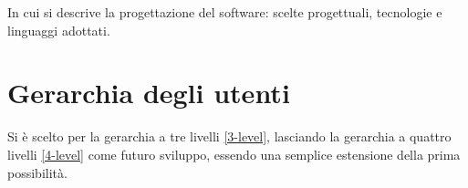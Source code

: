 In cui si descrive la progettazione del software: scelte progettuali, tecnologie e linguaggi adottati.

\section{Gerarchia degli utenti}
Si è scelto per la gerarchia a tre livelli \ref{3-level}, lasciando la gerarchia a quattro livelli \ref{4-level} come futuro sviluppo, essendo una semplice estensione della prima possibilità.